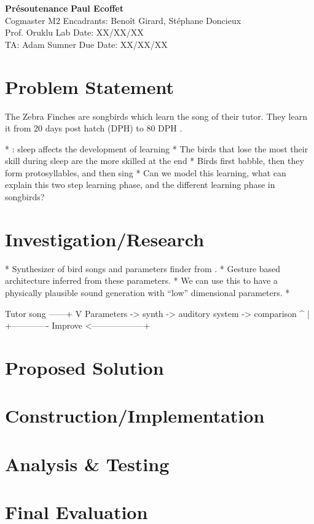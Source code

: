 \documentclass[a4paper, 11pt]{article}
\begin{document}
\noindent
\large\textbf{Présoutenance} \hfill \textbf{Paul Ecoffet} \\
\normalsize Cogmaster M2 \hfill Encadrants: Benoît Girard, Stéphane  Doncieux \\
Prof. Oruklu \hfill Lab Date: XX/XX/XX \\
TA: Adam Sumner \hfill Due Date: XX/XX/XX

\section*{Problem Statement}

The Zebra Finches are songbirds which learn the song of their tutor. They learn
it from 20 days post hatch (DPH) to 80 DPH \parencite{liu_juvenile_2004}.


\ifx
* \cite{deregnaucourt_how_2005} : sleep affects the development of learning
  * The birds that lose the most their skill during sleep are the more skilled
  at the end
* Birds first babble, then they form protosyllables, and then sing
* Can we model this learning, what can explain this two step learning phase, and
  the different learning phase in songbirds?
\fi

\section*{Investigation/Research}

\ifx
* Synthesizer of bird songs and parameters finder from \cite{boari_automatic_2015}.
* Gesture based architecture inferred from these parameters.
* We can use this to have a physically plausible sound generation with ``low''
  dimensional parameters.
* 

                            Tutor song ------+
                                             V
Parameters -> synth -> auditory system -> comparison
   ^                                         |
   +------------- Improve <------------------+

\fi



\section*{Proposed Solution}
\lipsum[4]

\section*{Construction/Implementation}
\lipsum[5]

\section*{Analysis \& Testing}
\lipsum[6]

\section*{Final Evaluation}
\lipsum[7]


\printbibliography{}
\end{document}
